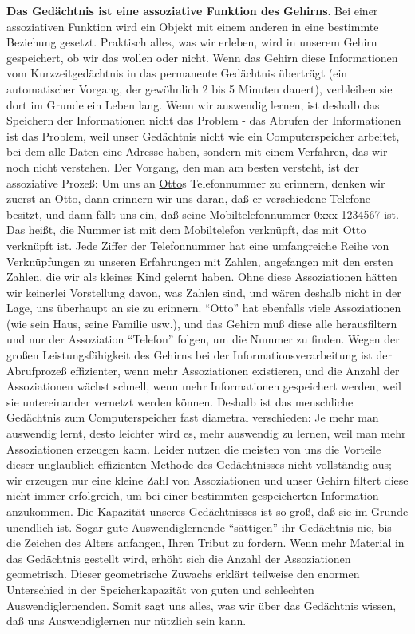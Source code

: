 \textbf{Das Gedächtnis ist eine assoziative Funktion des Gehirns}.
Bei einer assoziativen Funktion wird ein Objekt mit einem anderen in eine bestimmte Beziehung gesetzt.
Praktisch alles, was wir erleben, wird in unserem Gehirn gespeichert, ob wir das wollen oder nicht.
Wenn das Gehirn diese Informationen vom Kurzzeitgedächtnis in das permanente Gedächtnis überträgt (ein automatischer Vorgang, der gewöhnlich 2 bis 5 Minuten dauert), verbleiben sie dort im Grunde ein Leben lang.
Wenn wir auswendig lernen, ist deshalb das Speichern der Informationen nicht das Problem - das Abrufen der Informationen ist das Problem, weil unser Gedächtnis nicht wie ein Computerspeicher arbeitet, bei dem alle Daten eine Adresse haben, sondern mit einem Verfahren, das wir noch nicht verstehen.
Der Vorgang, den man am besten versteht, ist der assoziative Prozeß: Um uns an \hyperlink{johndoe}{Otto}s Telefonnummer zu erinnern, denken wir zuerst an Otto, dann erinnern wir uns daran, daß er verschiedene Telefone besitzt, und dann fällt uns ein, daß seine Mobiltelefonnummer 0xxx-1234567 ist.
Das heißt, die Nummer ist mit dem Mobiltelefon verknüpft, das mit Otto verknüpft ist.
Jede Ziffer der Telefonnummer hat eine umfangreiche Reihe von Verknüpfungen zu unseren Erfahrungen mit Zahlen, angefangen mit den ersten Zahlen, die wir als kleines Kind gelernt haben.
Ohne diese Assoziationen hätten wir keinerlei Vorstellung davon, was Zahlen sind, und wären deshalb nicht in der Lage, uns überhaupt an sie zu erinnern.
\enquote{Otto} hat ebenfalls viele Assoziationen (wie sein Haus, seine Familie usw.), und das Gehirn muß diese alle herausfiltern und nur der Assoziation \enquote{Telefon} folgen, um die Nummer zu finden.
Wegen der großen Leistungsfähigkeit des Gehirns bei der Informationsverarbeitung ist der Abrufprozeß effizienter, wenn mehr Assoziationen existieren, und die Anzahl der Assoziationen wächst schnell, wenn mehr Informationen gespeichert werden, weil sie untereinander vernetzt werden können.
Deshalb ist das menschliche Gedächtnis zum Computerspeicher fast diametral verschieden: Je mehr man auswendig lernt, desto leichter wird es, mehr auswendig zu lernen, weil man mehr Assoziationen erzeugen kann.
Leider nutzen die meisten von uns die Vorteile dieser unglaublich effizienten Methode des Gedächtnisses nicht vollständig aus; wir erzeugen nur eine kleine Zahl von Assoziationen und unser Gehirn filtert diese nicht immer erfolgreich, um bei einer bestimmten gespeicherten Information anzukommen.
Die Kapazität unseres Gedächtnisses ist so groß, daß sie im Grunde unendlich ist.
Sogar gute Auswendiglernende \enquote{sättigen} ihr Gedächtnis nie, bis die Zeichen des Alters anfangen, Ihren Tribut zu fordern.
Wenn mehr Material in das Gedächtnis gestellt wird, erhöht sich die Anzahl der Assoziationen geometrisch.
Dieser geometrische Zuwachs erklärt teilweise den enormen Unterschied in der Speicherkapazität von guten und schlechten Auswendiglernenden.
Somit sagt uns alles, was wir über das Gedächtnis wissen, daß uns Auswendiglernen nur nützlich sein kann.


